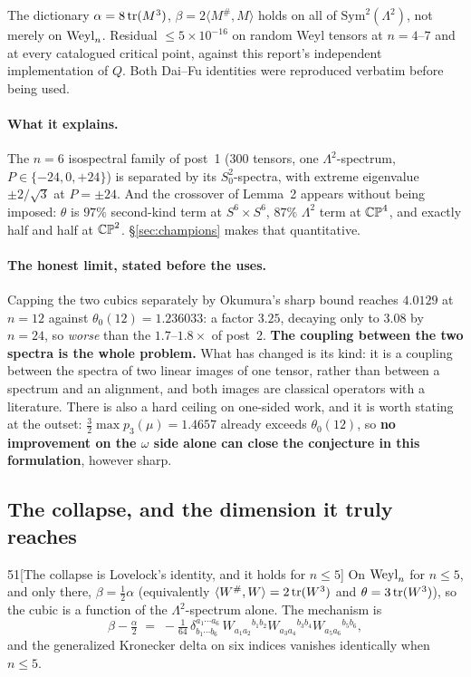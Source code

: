 \begin{certificate}
The dictionary $\alpha=8\operatorname{tr}(M^3)$, $\beta=2\langle M^{\#},M\rangle$ holds on all of $\mathrm{Sym}^2(\Lambda^2)$, not merely on $\mathrm{Weyl}_n$. Residual $\le5\times10^{-16}$ on random Weyl tensors at $n=4$--$7$ and at every catalogued critical point, against this report's independent implementation of $Q$. Both Dai--Fu identities were reproduced verbatim before being used.
\end{certificate}

\paragraph{What it explains.} The $n=6$ isospectral family of post~1 ($300$ tensors, one $\Lambda^2$-spectrum, $P\in\{-24,0,+24\}$) is separated by its $S^2_0$-spectra, with extreme eigenvalue $\pm2/\sqrt3$ at $P=\pm24$. And the crossover of Lemma~2 appears without being imposed: $\theta$ is $97\%$ second-kind term at $S^6\times S^6$, $87\%$ $\Lambda^2$ term at $\mathbb{CP}^4$, and exactly half and half at $\mathbb{CP}^2$. \S\ref{sec:champions} makes that quantitative.

\paragraph{The honest limit, stated before the uses.} Capping the two cubics separately by Okumura's sharp bound reaches $4.0129$ at $n=12$ against $\theta_0(12)=1.236033$: a factor $3.25$, decaying only to $3.08$ by $n=24$, so \emph{worse} than the $1.7$--$1.8\times$ of post~2. \textbf{The coupling between the two spectra is the whole problem.} What has changed is its kind: it is a coupling between the spectra of two linear images of one tensor, rather than between a spectrum and an alignment, and both images are classical operators with a literature. There is also a hard ceiling on one-sided work, and it is worth stating at the outset: $\tfrac32\max p_3(\mu)=1.4657$ already exceeds $\theta_0(12)$, so \textbf{no improvement on the $\omega$ side alone can close the conjecture in this formulation}, however sharp.

\subsection{The collapse, and the dimension it truly reaches}\label{sec:lovelock}

\begin{Lem}{51}[The collapse is Lovelock's identity, and it holds for $n\le5$]
On $\mathrm{Weyl}_n$ for $n\le5$, and only there, $\beta=\tfrac12\alpha$ (equivalently $\langle W^{\#},W\rangle=2\operatorname{tr}(W^3)$ and $\theta=3\operatorname{tr}(W^3)$), so the cubic is a function of the $\Lambda^2$-spectrum alone. The mechanism is
\[
\beta-\tfrac\alpha2\;=\;-\tfrac1{64}\,\delta^{a_1\cdots a_6}_{b_1\cdots b_6}\,
W_{a_1a_2}{}^{b_1b_2}W_{a_3a_4}{}^{b_3b_4}W_{a_5a_6}{}^{b_5b_6},
\]
and the generalized Kronecker delta on six indices vanishes identically when $n\le5$.
\end{Lem}

